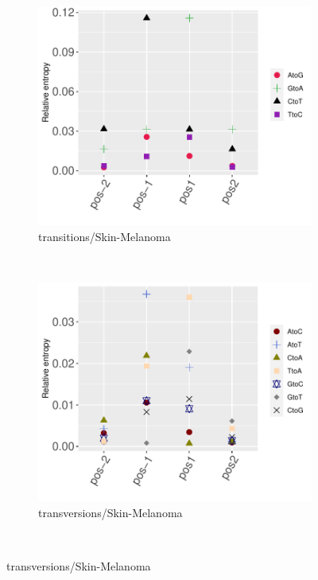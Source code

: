 \begin{figure}[ht!]
    \begin{subfigure}{.5\textwidth}
    \includegraphics[scale=0.63]{graphics/nbr_transitions_Skin-Melanoma.pdf}
    \caption{transitions/Skin-Melanoma}
    \label{fig:transitions_skin}
    \end{subfigure}
    ~
    \begin{subfigure}{.5\textwidth}
    \includegraphics[scale=0.63]{graphics/nbr_transversion_Skin-Melanoma.pdf}
    \caption{transversions/Skin-Melanoma}
    \label{fig:transversions_skin}
    \end{subfigure} \\
    \vspace{0.5cm}
    

\end{figure}
